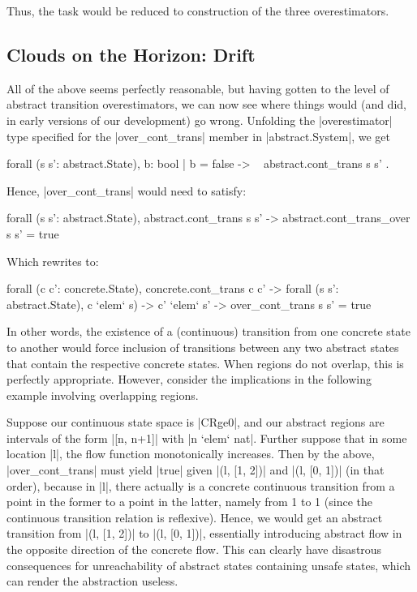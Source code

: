 \documentclass[runningheads]{llncs}
\begin{document}
{Thus, the task would be reduced to construction of the three overestimators.

\subsection{Clouds on the Horizon: Drift}
\label{trouble}

All of the above seems perfectly reasonable, but having gotten to the level of abstract transition overestimators, we can now see where things would (and did, in early versions of our development) go wrong. Unfolding the |overestimator| type specified for the |over_cont_trans| member in |abstract.System|, we get
\begin{code}
  forall (s s': abstract.State), { b: bool | b = false -> ~ abstract.cont_trans s s' }.
\end{code}
Hence, |over_cont_trans| would need to satisfy:
\begin{code}
  forall (s s': abstract.State), abstract.cont_trans s s' ->
    abstract.cont_trans_over s s' = true
\end{code}
Which rewrites to:
\begin{code}
  forall (c c': concrete.State), concrete.cont_trans c c' ->
  forall (s s': abstract.State), c `elem` s) -> c' `elem` s' ->
    over_cont_trans s s' = true
\end{code}
In other words, the existence of a (continuous) transition from one concrete state to another would force inclusion of transitions between any two abstract states that contain the respective concrete states. When regions do not overlap, this is perfectly appropriate. However, consider the implications in the following example involving overlapping regions.

Suppose our continuous state space is |CRge0|, and our abstract regions are intervals of the form |[n, n+1]| with |n `elem` nat|. Further suppose that in some location |l|, the flow function monotonically increases. Then by the above, |over_cont_trans| must yield |true| given |(l, [1, 2])| and |(l, [0, 1])| (in that order), because in |l|, there actually is a concrete continuous transition from a point in the former to a point in the latter, namely from 1 to 1 (since the continuous transition relation is reflexive). Hence, we would get an abstract transition from |(l, [1, 2])| to |(l, [0, 1])|, essentially introducing abstract flow in the opposite direction of the concrete flow. This can clearly have disastrous consequences for unreachability of abstract states containing unsafe states, which can render the abstraction useless.

}
\end{document}
